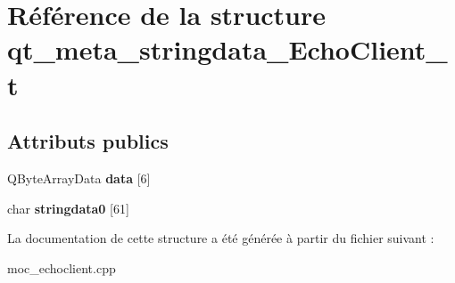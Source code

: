 \hypertarget{structqt__meta__stringdata__EchoClient__t}{}\section{Référence de la structure qt\+\_\+meta\+\_\+stringdata\+\_\+\+Echo\+Client\+\_\+t}
\label{structqt__meta__stringdata__EchoClient__t}
\subsection*{Attributs publics}
\begin{DoxyCompactItemize}
\item 
Q\+Byte\+Array\+Data {\bfseries data} \mbox{[}6\mbox{]}\hypertarget{structqt__meta__stringdata__EchoClient__t_a7b2bbb612d8683c72c829480006e0640}{}\label{structqt__meta__stringdata__EchoClient__t_a7b2bbb612d8683c72c829480006e0640}

\item 
char {\bfseries stringdata0} \mbox{[}61\mbox{]}\hypertarget{structqt__meta__stringdata__EchoClient__t_a16c89302790e0ee63ddb4dd7fbae4f57}{}\label{structqt__meta__stringdata__EchoClient__t_a16c89302790e0ee63ddb4dd7fbae4f57}

\end{DoxyCompactItemize}


La documentation de cette structure a été générée à partir du fichier suivant \+:\begin{DoxyCompactItemize}
\item 
moc\+\_\+echoclient.\+cpp\end{DoxyCompactItemize}
